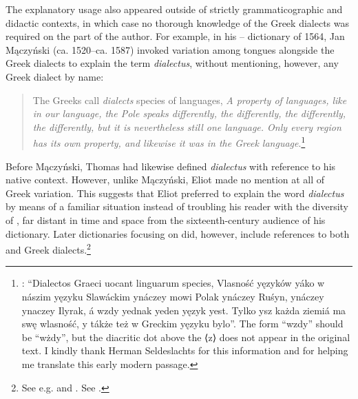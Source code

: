 The explanatory usage also appeared outside of strictly grammaticographic and didactic contexts, in which case no thorough knowledge of the Greek dialects was required on the part of the author. For example, in his – dictionary of 1564, Jan Mączyński (ca. 1520–ca. 1587) invoked variation among  tongues alongside the Greek dialects to explain the  term \textit{dialectus}, without mentioning, however, any Greek dialect by name:

\begin{quote}
The Greeks call \textit{dialects} species of languages, \textit{A property of languages, like in our  language, the Pole speaks differently, the  differently, the  differently, the  differently, but it is nevertheless still one language. Only every region has its own property, and likewise it was in the Greek language}.\footnote{\citet[ \textit{s.v.} “dialectus”]{Maczynski1564}: “Dialectos Graeci uocant linguarum species, Vlasność yęzyków yáko w nászim yęzyku Slawáckim ynáczey mowi Polak ynáczey Ruśyn, ynáczey  ynaczey Ilyrak, á wzdy yednak yeden yęzyk yest. Tylko ysz każda ziemiá ma swę wlasność, y tákże też w Greckim yęzyku bylo”. The form “wzdy” should be “wżdy”, but the diacritic dot above the ⟨z⟩ does not appear in the original text. I kindly thank Herman Seldeslachts for this information and for helping me translate this early modern  passage.}
\end{quote}

Before Mączyński, Thomas \citet[\textsc{xxxiii}\textsc{\textsuperscript{v}}]{Eliot1538} had likewise defined \textit{dialectus} with reference to his native context. However, unlike Mączyński, Eliot made no mention at all of Greek variation. This suggests that Eliot preferred to explain the  word \textit{dialectus} by means of a familiar situation instead of troubling his reader with the diversity of , far distant in time and space from the sixteenth-century  audience of his dictionary. Later dictionaries focusing on  did, however, include references to both  and Greek dialects.\footnote{See e.g. \citet[\textit{s.v.} “dialect”]{Bullokar1616} and \citet[\textit{s.v.} “dialect”]{Blount1656}. See \citet[7]{Blank1996}.}

